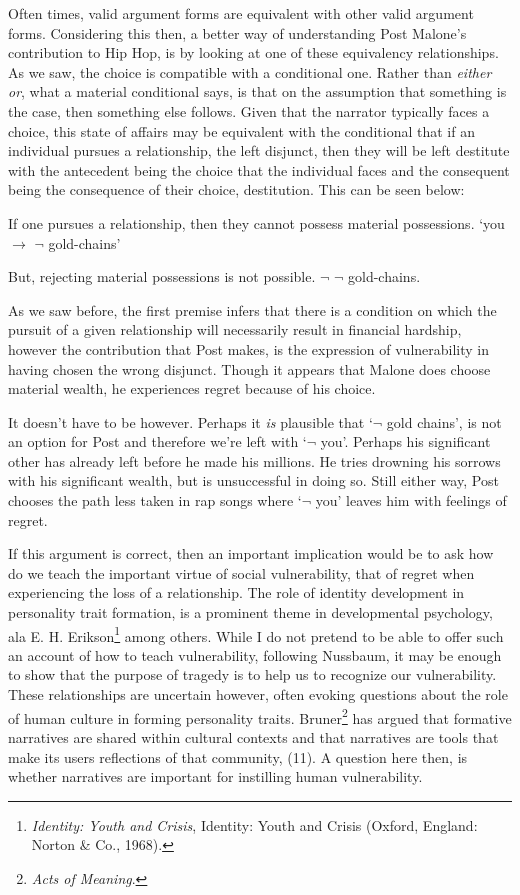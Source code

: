 \documentclass[phdthesis,12pt,final,a4paper]{wuthesis}
\theoremstyle{definition}
\theoremstyle{definition}
\theoremstyle{definition}
\theoremstyle{definition}
\theoremstyle{remark}
\begin{document}
Often times, valid argument forms are equivalent with other valid argument forms. Considering this then, a better way of understanding Post Malone's contribution to Hip Hop, is by looking at one of these equivalency relationships. As we saw, the choice is compatible with a conditional one. Rather than \emph{either or}, what a material conditional says, is that on the assumption that something is the case, then something else follows. Given that the narrator typically faces a choice, this state of affairs may be equivalent with the conditional that if an individual pursues a relationship, the left disjunct, then they will be left destitute with the antecedent being the choice that the individual faces and the consequent being the consequence of their choice, destitution. This can be seen below:

If one pursues a relationship, then they cannot possess material possessions. `you \(\rightarrow\) \(\lnot\) gold-chains'

But, rejecting material possessions is not possible. \(\lnot\) \(\lnot\) gold-chains.

As we saw before, the first premise infers that there is a condition on which the pursuit of a given relationship will necessarily result in financial hardship, however the contribution that Post makes, is the expression of vulnerability in having chosen the wrong disjunct. Though it appears that Malone does choose material wealth, he experiences regret because of his choice.

It doesn't have to be however. Perhaps it \emph{is} plausible that `\(\lnot\) gold chains', is not an option for Post and therefore we're left with `\(\lnot\) you'. Perhaps his significant other has already left before he made his millions. He tries drowning his sorrows with his significant wealth, but is unsuccessful in doing so. Still either way, Post chooses the path less taken in rap songs where `\(\lnot\) you' leaves him with feelings of regret.

If this argument is correct, then an important implication would be to ask how do we teach the important virtue of social vulnerability, that of regret when experiencing the loss of a relationship. The role of identity development in personality trait formation, is a prominent theme in developmental psychology, ala E. H. Erikson\footnote{\emph{Identity: Youth and Crisis}, Identity: Youth and Crisis (Oxford, England: Norton \& Co., 1968).} among others. While I do not pretend to be able to offer such an account of how to teach vulnerability, following Nussbaum, it may be enough to show that the purpose of tragedy is to help us to recognize our vulnerability. These relationships are uncertain however, often evoking questions about the role of human culture in forming personality traits. Bruner\footnote{\emph{Acts of Meaning}.} has argued that formative narratives are shared within cultural contexts and that narratives are tools that make its users reflections of that community, (11). A question here then, is whether narratives are important for instilling human vulnerability.
\end{document}
